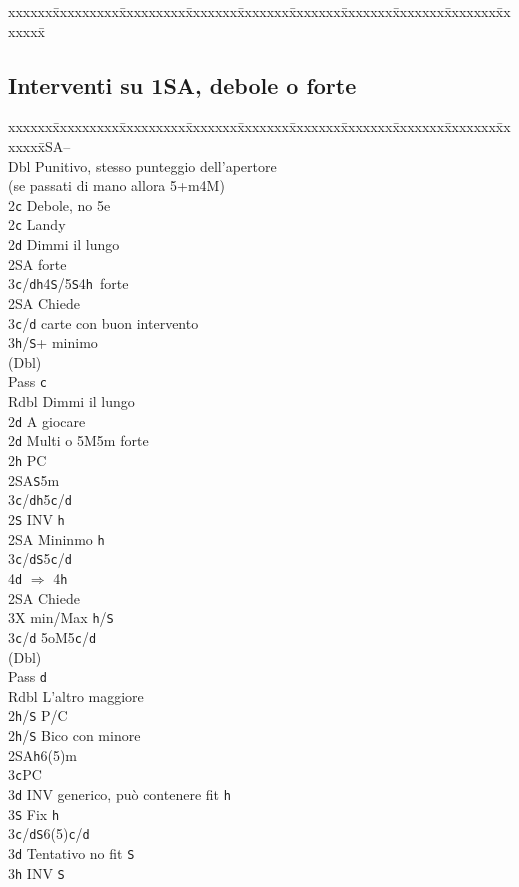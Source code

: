 \documentclass[a4paper,italian]{article}
\newcommand{\BS}{\small{\texttt{S}}}
\newcommand{\BC}{\small{\texttt{c}}}
\newcommand{\BD}{\small{\texttt{d}}}
\newcommand{\BH}{\small{\texttt{h}}}
\newenvironment{bidtable}
{\begin{tabbing}

    xxxxxx\=xxxxxxxxx\=xxxxxxxxx\=xxxxxxx\=xxxxxxx\=xxxxxxx\=xxxxxxx\=xxxxxxx\=xxxxxxx\=xxxxxxx\=\kill}
{\end{tabbing} }%
\begin{document}
\begin{multicols}{2}
\begin{bidtable}
    \end{bidtable}
    \vfill\null
    \columnbreak

    \subsection{Interventi su 1\small{SA}, debole o forte}

    \begin{bidtable}
        1\small{SA}--\+\\
        Dbl \> Punitivo, stesso punteggio dell'apertore\+\\(se passati di mano allora 5+m4M)\\
        2\BC\> Debole, no 5e\-\\
        2\BC \> Landy\+\\
        2\BD\> Dimmi il lungo\+\\
        2\small{SA} forte\\
        3\BC/\BD{}\BH4\BS/5\BS4\BH\ forte\-\\
        2\small{SA} \> Chiede\+\\
        3\BC/\BD{} carte con buon intervento\\
        3\BH/\BS{}+ minimo\-\\
        (Dbl)\+\\
        Pass \> \BC\\
        Rdbl \> Dimmi il lungo\\
        2\BD \> A giocare\-\-\\
        2\BD\> Multi o 5M5m forte\+\\
        2\BH\> PC\+\\
        2\small{SA}\BS5m\\
        3\BC/\BD{}\BH5\BC/\BD\-\\
        2\BS\> INV \BH\+\\
        2\small{SA}\> Mininmo \BH\\
        3\BC/\BD{}\BS5\BC/\BD\\
        4\BD\> $\Rightarrow$ 4\BH\-\\
        2\small{SA}\> Chiede\+\\
        3X\> min/Max \BH/\BS\-\\
        3\BC/\BD\> 5oM5\BC/\BD\\
        (Dbl)\+\\
        Pass \> \BD\\
        Rdbl \> L'altro maggiore\\
        2\BH/\BS \> P/C\-\-\\
        2\BH/\BS\> Bico con minore\\
        2\small{SA}\BH6(5)m\+\\
        3\BC\>PC\\
        3\BD\> INV generico, può contenere fit \BH\\
        3\BS\> Fix \BH\-\\
        3\BC/\BD{}\BS6(5)\BC/\BD\+\\
        3\BD\> Tentativo no fit \BS\\
        3\BH\> INV \BS
    \end{bidtable}


\end{multicols}
\end{document}
